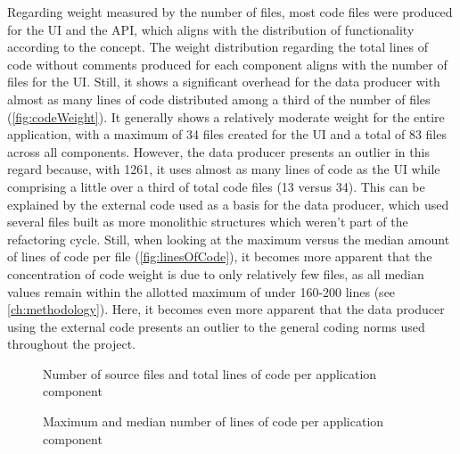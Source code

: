 Regarding weight measured by the number of files, most code files were produced for the \ac{UI} and the \ac{API}, which aligns with the distribution of functionality according to the concept.
The weight distribution regarding the total lines of code without comments produced for each component aligns with the number of files for the \ac{UI}.
Still, it shows a significant overhead for the data producer with almost as many lines of code distributed among a third of the number of files (\autoref{fig:codeWeight}).
It generally shows a relatively moderate weight for the entire application, with a maximum of 34 files created for the \ac{UI} and a total of 83 files across all components.
However, the data producer presents an outlier in this regard because, with 1261, it uses almost as many lines of code as the  \ac{UI} while comprising a little over a third of total code files (13 versus 34).
This can be explained by the external code used as a basis for the data producer, which used several files built as more monolithic structures which weren't part of the refactoring cycle.
Still, when looking at the maximum versus the median amount of lines of code per file (\autoref{fig:linesOfCode}), it becomes more apparent that the concentration of code weight is due to only relatively few files, as all median values remain within the allotted maximum of under 160-200 lines (see \autoref{ch:methodology}).
Here, it becomes even more apparent that the data producer using the external code presents an outlier to the general coding norms used throughout the project.

\begin{figure*}[!ht]
\hfill

\caption[Source file count and total lines of code]{Number of source files and total lines of code per application component\protect}
\label{fig:codeWeight}
\end{figure*}

\begin{figure}[!ht]
\centering

\caption[Lines of code per application component]{Maximum and median number of lines of code per application component\protect}
\label{fig:linesOfCode}
\end{figure}

